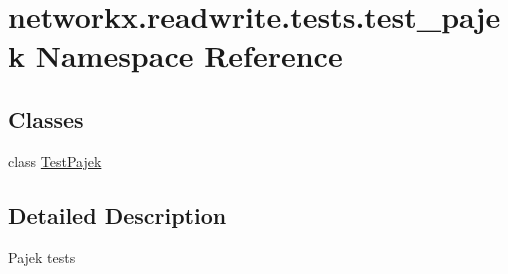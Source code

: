\hypertarget{namespacenetworkx_1_1readwrite_1_1tests_1_1test__pajek}{}\section{networkx.\+readwrite.\+tests.\+test\+\_\+pajek Namespace Reference}
\label{namespacenetworkx_1_1readwrite_1_1tests_1_1test__pajek}
\subsection*{Classes}
\begin{DoxyCompactItemize}
\item 
class \hyperlink{classnetworkx_1_1readwrite_1_1tests_1_1test__pajek_1_1TestPajek}{Test\+Pajek}
\end{DoxyCompactItemize}


\subsection{Detailed Description}
\begin{DoxyVerb}Pajek tests
\end{DoxyVerb}
 